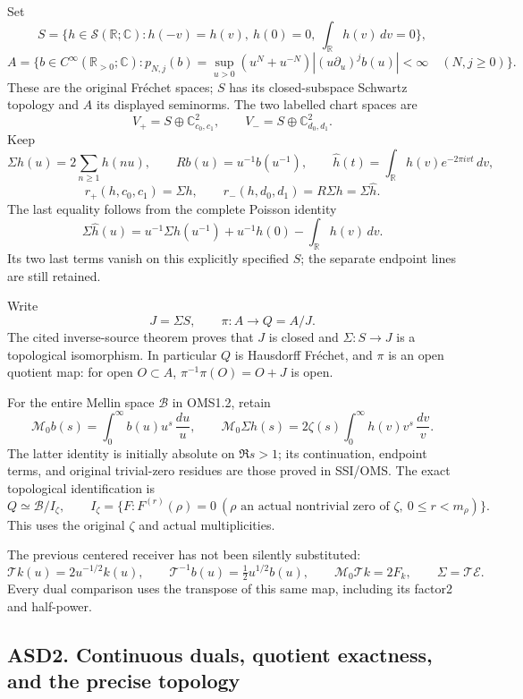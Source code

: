Set \[
 S=\{h\in\mathcal S(\mathbb R;\mathbb C):
 h(-v)=h(v),\ h(0)=0,\ \int_{\mathbb R}h(v)\,dv=0\},
\] \[
 A=\{b\in C^\infty(\mathbb R_{>0};\mathbb C):
 p_{N,j}(b)=\sup_{u>0}(u^N+u^{-N})
 |(u\partial_u)^jb(u)|<\infty\quad(N,j\ge0)\}.
 \tag{ASD1.1}
\] These are the original Fréchet spaces; \(S\) has its closed-subspace
Schwartz topology and \(A\) its displayed seminorms. The two labelled
chart spaces are \[
 V_+=S\oplus\mathbb C^2_{c_0,c_1},\qquad
 V_-=S\oplus\mathbb C^2_{d_0,d_1}.
\] Keep \[
 \Sigma h(u)=2\sum_{n\ge1}h(nu),\qquad
 Rb(u)=u^{-1}b(u^{-1}),\qquad
 \widehat h(t)=\int_{\mathbb R}h(v)e^{-2\pi ivt}\,dv ,
 \tag{ASD1.2}
\] \[
 r_+(h,c_0,c_1)=\Sigma h,\qquad
 r_-(h,d_0,d_1)=R\Sigma h=\Sigma\widehat h.
 \tag{ASD1.3}
\] The last equality follows from the complete Poisson identity \[
 \Sigma\widehat h(u)=u^{-1}\Sigma h(u^{-1})
       +u^{-1}h(0)-\int_{\mathbb R}h(v)\,dv.
 \tag{ASD1.4}
\] Its two last terms vanish on this explicitly specified \(S\); the
separate endpoint lines are still retained.

Write \[
 J=\Sigma S,\qquad \pi:A\longrightarrow Q=A/J .
 \tag{ASD1.5}
\] The cited inverse-source theorem proves that \(J\) is closed and
\(\Sigma:S\to J\) is a topological isomorphism. In particular \(Q\) is
Hausdorff Fréchet, and \(\pi\) is an open quotient map: for open
\(O\subset A\), \(\pi^{-1}\pi(O)=O+J\) is open.

For the entire Mellin space \(\mathcal B\) in OMS1.2, retain \[
 \mathcal M_0b(s)=\int_0^\infty b(u)u^s\,\frac{du}{u},\qquad
 \mathcal M_0\Sigma h(s)=
 2\zeta(s)\int_0^\infty h(v)v^s\,\frac{dv}{v}.
 \tag{ASD1.6}
\] The latter identity is initially absolute on \(\Re s>1\); its
continuation, endpoint terms, and original trivial-zero residues are
those proved in SSI/OMS. The exact topological identification is \[
 Q\simeq\mathcal B/I_\zeta,\qquad
 I_\zeta=\{F:F^{(r)}(\rho)=0\
 (\rho\text{ an actual nontrivial zero of }\zeta,\ 0\le r<m_\rho)\}.
 \tag{ASD1.7}
\] This uses the original \(\zeta\) and actual multiplicities.

The previous centered receiver has not been silently substituted: \[
 \mathcal T k(u)=2u^{-1/2}k(u),\qquad
 \mathcal T^{-1}b(u)=\tfrac12u^{1/2}b(u),\qquad
 \mathcal M_0\mathcal Tk=2F_k,\qquad \Sigma=\mathcal T\mathcal E.
 \tag{ASD1.8}
\] Every dual comparison uses the transpose of this same map, including
its factor2 and half-power.

\subsection{ASD2. Continuous duals, quotient exactness, and the precise
topology}\label{asd2.-continuous-duals-quotient-exactness-and-the-precise-topology}

